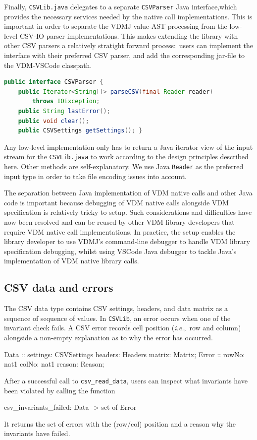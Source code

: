 \documentclass[runningheads,a4paper]{llncs}
\begin{document}
Finally, \texttt{CSVLib.java} delegates to a separate \texttt{CSVParser} Java interface,which provides the necessary services needed by the native call implementations. This is important in order to separate the VDMJ value-AST processing from the low-level CSV-IO parser implementations. This makes extending the library with other CSV parsers a relatively stratight forward process:~users can implement the interface with their preferred CSV parser, and add the corresponding jar-file to the VDM-VSCode classpath. 
%
\begin{lstlisting}[language=Java,basicstyle=\footnotesize\ttfamily]
public interface CSVParser {
    public Iterator<String[]> parseCSV(final Reader reader) 
        throws IOException;
    public String lastError();
    public void clear();
    public CSVSettings getSettings(); } 
\end{lstlisting}
%
Any low-level implementation only has to return a Java iterator view of the input stream for the \texttt{CSVLib.java} to work according to the design principles described here. Other methods are self-explanatory. We use Java \texttt{Reader} as the preferred input type in order to take file encoding issues into account.  

The separation between Java implementation of VDM native calls and other Java code is important because debugging of VDM native calls alongside VDM specification is relatively tricky to setup. Such considerations and difficulties have now been resolved and can be reused by other VDM library developers that require VDM native call implementations. In practice, the setup enables the library developer to use VDMJ's command-line debugger to handle VDM library specification debugging, whilst using VSCode Java debugger to tackle Java's implementation of VDM native library calls. 
 
\subsection*{CSV data and errors}\label{subsec:DataAndErrors}

The CSV data type contains CSV settings, headers, and data matrix as a sequence of sequence of values. In \texttt{CSVLib}, an error occurs when one of the invariant check fails. A CSV error records cell position (\textit{i.e.},~row and column) alongside a non-empty explanation as to why the error has occurred.    
%
\begin{vdmsl}[frame=none,basicstyle=\ttfamily\scriptsize]
  Data :: settings: CSVSettings headers: Headers matrix: Matrix;
 Error :: rowNo: nat1 colNo: nat1 reason: Reason;
\end{vdmsl}  
%
\noindent After a successful call to \texttt{csv\_read\_data}, users can inspect what invariants have been violated by calling the function 
%
\begin{vdmsl}[frame=none,basicstyle=\ttfamily\scriptsize]
    csv_invariants_failed: Data -> set of Error
\end{vdmsl}
%
\noindent It returns the set of errors with the (row/col) position and a reason why the invariants have failed.  
\end{document}
